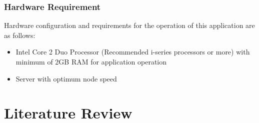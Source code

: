 \subsection{Hardware Requirement}
Hardware configuration and requirements for the
operation of this application are as follows:
\vspace{-18pt}
\begin{itemize}
	\item Intel Core 2 Duo Processor (Recommended i-series processors or more) with minimum of 2GB RAM for application operation
	\item Server with optimum node speed
\end{itemize}



\chapter{Literature Review}

